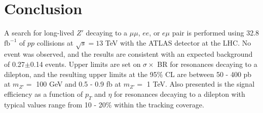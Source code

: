 \chapter{Conclusion}
\label{chap:conclusion}

A search for long-lived $Z'$ decaying to a $\mu\mu$, $ee$, or $e\mu$ pair is performed using 32.8 $\mathrm{fb^{-1}}$ of $pp$ collisions at $\sqrt{s}=13$ TeV with the ATLAS detector at the LHC. No event was observed, and the results are consistent with an expected background of 0.27$\pm$0.14 events. Upper limits are set on $\sigma \times$ BR for resonances decaying to a dilepton, and the resulting upper limits at the 95\% CL are between 50 - 400 pb at $m_{Z'}=$ 100 GeV and 0.5 - 0.9 fb at $m_{Z'}=$ 1 TeV. %
Also presented is the signal efficiency as a function of $p_{T}$ and $\eta$ for resonances decaying to a dilepton with typical values range from 10 - 20\% within the tracking coverage.

